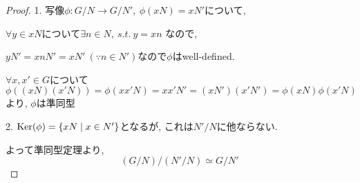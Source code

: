 \begin{proof}
    \large{1.} 写像$\phi:G/N \rightarrow G/N',\ \phi(xN)=xN'$について,
    
    $\forall y \in xN$について$\exists n \in N,\ s.t.\ y = xn$ なので, 
    
    $yN' = xnN' = xN'\ (\because n \in N')$なので$\phi$はwell-defined.
    
    $\forall x, x' \in G$について
    \begin{equation*}
        \phi((xN)(x'N)) = \phi(xx'N) = xx'N' = (xN')(x'N') = \phi(xN)\phi(x'N)
    \end{equation*}
    より, $\phi$は準同型

    \large{2.} $\mathrm{Ker}(\phi) = \qty{ xN \mid x \in N' }$となるが, これは$N'/N$に他ならない.

    よって準同型定理より,
    \begin{equation*}
        (G/N)/(N'/N) \simeq G/N'
    \end{equation*}
\end{proof}